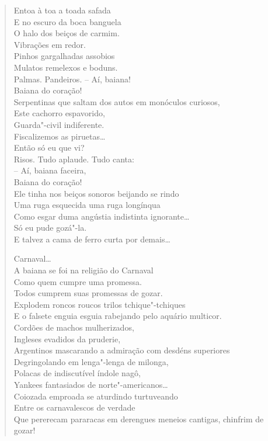 \begin{verse}
Entoa à toa a toada safada\\
E no escuro da boca banguela\\
O halo dos beiços de carmim.\\
Vibrações em redor.\\
Pinhos gargalhadas assobios\\
Mulatos remelexos e boduns.\\
Palmas. Pandeiros. -- Aí, baiana!\\
\qquad\qquad\qquad\qquad\quad Baiana do coração!\\
Serpentinas que saltam dos autos em monóculos curiosos,\\
Este cachorro espavorido,\\
Guarda"-civil indiferente.\\
Fiscalizemos as piruetas\ldots{}\\
Então só eu que vi?\\
Risos. Tudo aplaude. Tudo canta:\\
\quad\quad{}-- Aí, baiana faceira,\\
\quad\quad{}Baiana do coração!\\
Ele tinha nos beiços sonoros beijando se rindo\\
Uma ruga esquecida uma ruga longínqua\\
Como esgar duma angústia indistinta ignorante\ldots{}\\
Só eu pude gozá"-la.\\
E talvez a cama de ferro curta por demais\ldots{}

Carnaval\ldots{}\\
A baiana se foi na religião do Carnaval\\
Como quem cumpre uma promessa.\\
Todos cumprem suas promessas de gozar.\\
Explodem roncos roucos trilos tchique"-tchiques\\
E o falsete enguia esguia rabejando pelo aquário multicor.\\
Cordões de machos mulherizados,\\
Ingleses evadidos da pruderie,\\
Argentinos mascarando a admiração com desdéns superiores\\
Degringolando em lenga"-lenga de milonga,\\
Polacas de indiscutível índole nagô,\\
Yankees fantasiados de norte"-americanos\ldots{}\\
Coiozada emproada se aturdindo turtuveando\\
Entre os carnavalescos de verdade\\
Que pererecam pararacas em derengues meneios cantigas, chinfrim de gozar!


\end{verse}
